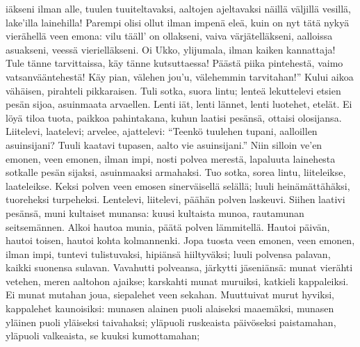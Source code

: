     iäkseni ilman alle,
    tuulen tuuiteltavaksi,
    aaltojen ajeltavaksi
    näillä väljillä vesillä,
    lake'illa lainehilla!
  \endverse
  \beginverse
    Parempi olisi ollut
    ilman impenä eleä,
    kuin on nyt tätä nykyä
    vierähellä veen emona:
    vilu tääll' on ollakseni,
    vaiva värjätelläkseni,
    aalloissa asuakseni,
    veessä vierielläkseni.
    Oi Ukko, ylijumala,
    ilman kaiken kannattaja!
  \endverse
  \beginverse
    Tule tänne tarvittaissa,
    käy tänne kutsuttaessa!
    Päästä piika pintehestä,
    vaimo vatsanvääntehestä!
    Käy pian, välehen jou'u,
    välehemmin tarvitahan!''
  \endverse
  \beginverse
    Kului aikoa vähäisen,
    pirahteli pikkaraisen.
    Tuli sotka, suora lintu;
    lenteä lekuttelevi
  \endverse
  \beginverse
    etsien pesän sijoa,
    asuinmaata arvaellen.
    Lenti iät, lenti lännet,
    lenti luotehet, etelät.
    Ei löyä tiloa tuota,
    paikkoa pahintakana,
    kuhun laatisi pesänsä,
    ottaisi olosijansa.
  \endverse
  \beginverse
    Liitelevi, laatelevi;
    arvelee, ajattelevi:
  \endverse
  \beginverse
    ``Teenkö tuulehen tupani,
    aalloillen asuinsijani?
    Tuuli kaatavi tupasen,
    aalto vie asuinsijani.''
    Niin silloin ve'en emonen,
    veen emonen, ilman impi,
    nosti polvea merestä,
    lapaluuta lainehesta
    sotkalle pesän sijaksi,
    asuinmaaksi armahaksi.
  \endverse
  \beginverse
    Tuo sotka, sorea lintu,
    liiteleikse, laateleikse.
    Keksi polven veen emosen
    sinerväisellä selällä;
    luuli heinämättähäksi,
    tuoreheksi turpeheksi.
    Lentelevi, liitelevi,
    päähän polven laskeuvi.
    Siihen laativi pesänsä,
    muni kultaiset munansa:
  \endverse
  \beginverse
    kuusi kultaista munoa,
    rautamunan seitsemännen.
  \endverse
  \beginverse
    Alkoi hautoa munia,
    päätä polven lämmitellä.
    Hautoi päivän, hautoi toisen,
    hautoi kohta kolmannenki.
    Jopa tuosta veen emonen,
    veen emonen, ilman impi,
    tuntevi tulistuvaksi,
    hipiänsä hiiltyväksi;
  \endverse
  \beginverse
    luuli polvensa palavan,
    kaikki suonensa sulavan.
    Vavahutti polveansa,
    järkytti jäseniänsä:
    munat vierähti vetehen,
    meren aaltohon ajaikse;
    karskahti munat muruiksi,
    katkieli kappaleiksi.
  \endverse
  \beginverse
    Ei munat mutahan joua,
    siepalehet veen sekahan.
  \endverse
  \beginverse
    Muuttuivat murut hyviksi,
    kappalehet kaunoisiksi:
    munasen alainen puoli
    alaiseksi maaemäksi,
    munasen yläinen puoli
    yläiseksi taivahaksi;
    yläpuoli ruskeaista
    päivöseksi paistamahan,
    yläpuoli valkeaista,
    se kuuksi kumottamahan;

